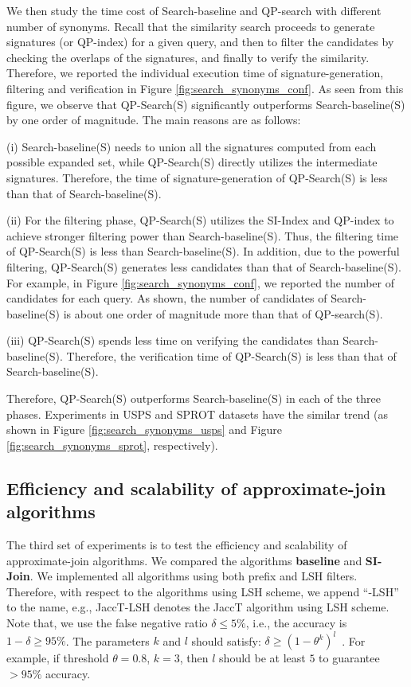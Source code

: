 We then study the time cost of Search-baseline and QP-search with different number of synonyms. Recall that the similarity search proceeds to  generate signatures (or QP-index) for a given query, and then to filter the candidates by checking the overlaps of the signatures, and finally to verify the similarity. Therefore, we reported the individual execution time of signature-generation, filtering and verification in Figure  \ref{fig:search_synonyms_conf}. As seen from this figure, we observe that QP-Search(S) significantly outperforms Search-baseline(S) by one order of magnitude. The main reasons are as follows:



(i)  Search-baseline(S) needs to union all the signatures computed from each possible expanded set, while QP-Search(S) directly utilizes the intermediate signatures. Therefore, the time of signature-generation of QP-Search(S) is less than that of Search-baseline(S).

(ii) For the filtering phase, QP-Search(S) utilizes the SI-Index and QP-index to achieve stronger filtering power than Search-baseline(S). Thus, the filtering time of QP-Search(S) is less than Search-baseline(S). In addition, due to the powerful filtering, QP-Search(S) generates less candidates than that of Search-baseline(S). For example, in Figure  \ref{fig:search_synonyms_conf}, we reported the number of candidates for each query. As shown, the number of candidates of Search-baseline(S) is about one order of magnitude more than that of QP-search(S).

(iii)  QP-Search(S) spends less time on verifying the candidates than Search-baseline(S). Therefore, the verification time of QP-Search(S) is less than that of Search-baseline(S).

Therefore, QP-Search(S) outperforms Search-baseline(S) in each of the three phases.  Experiments in USPS and SPROT datasets have the similar trend (as shown in Figure \ref{fig:search_synonyms_usps} and Figure \ref{fig:search_synonyms_sprot}, respectively).

\subsection{Efficiency and scalability of approximate-join algorithms}

The third set of experiments is to test the efficiency and scalability of
approximate-join algorithms. We compared the algorithms \textbf{baseline}
and \textbf{SI-Join}.  We implemented all algorithms using both
prefix and LSH filters. Therefore, with respect to the algorithms using
LSH scheme, we append ``-LSH'' to the name, e.g., JaccT-LSH denotes the
JaccT algorithm using LSH scheme. Note that, we use the false negative
ratio $\delta \leq 5\%$, i.e., the accuracy is $1-\delta \geq 95\%$. The
parameters $k$ and $l$ should satisfy: $\delta \geq
(1-\theta^k)^l$~\cite{journals/tods/XiaoWLYW11}. For example, if
threshold $\theta=0.8$, $k=3$, then $l$ should be at least $5$ to
guarantee $> 95\%$ accuracy.

